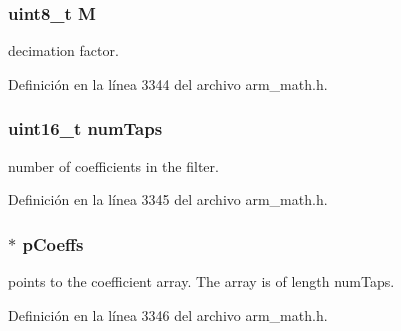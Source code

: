 \subsubsection[{\texorpdfstring{M}{M}}]{\setlength{\rightskip}{0pt plus 5cm}uint8\+\_\+t M}\hypertarget{structarm__fir__decimate__instance__f32_ae2c8107d00d3c9942e7a20fc598edecf}{}\label{structarm__fir__decimate__instance__f32_ae2c8107d00d3c9942e7a20fc598edecf}
decimation factor. 

Definición en la línea 3344 del archivo arm\+\_\+math.\+h.

\subsubsection[{\texorpdfstring{num\+Taps}{numTaps}}]{\setlength{\rightskip}{0pt plus 5cm}uint16\+\_\+t num\+Taps}\hypertarget{structarm__fir__decimate__instance__f32_a751941891e47f522a7f5375fe8990aac}{}\label{structarm__fir__decimate__instance__f32_a751941891e47f522a7f5375fe8990aac}
number of coefficients in the filter. 

Definición en la línea 3345 del archivo arm\+\_\+math.\+h.

\subsubsection[{\texorpdfstring{p\+Coeffs}{pCoeffs}}]{$\ast$ p\+Coeffs}\hypertarget{structarm__fir__decimate__instance__f32_aacbb8dd8eeba4b21fc2bb40076405ee3}{}\label{structarm__fir__decimate__instance__f32_aacbb8dd8eeba4b21fc2bb40076405ee3}
points to the coefficient array. The array is of length num\+Taps. 

Definición en la línea 3346 del archivo arm\+\_\+math.\+h.

